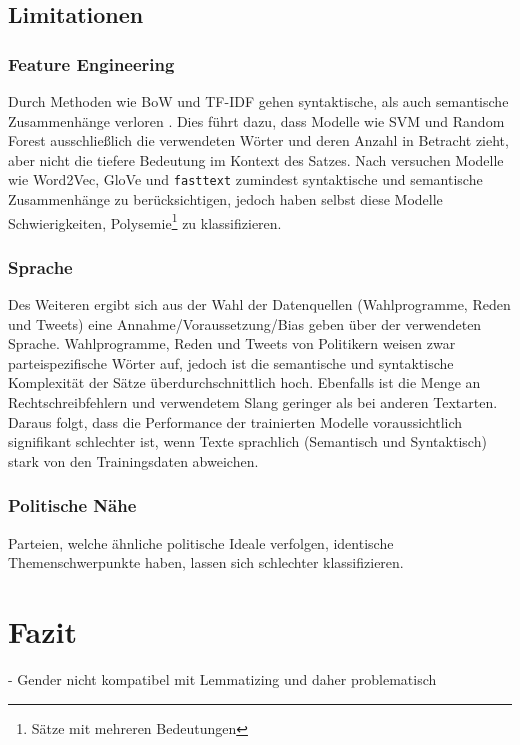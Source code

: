 \subsection{Limitationen}

\subsubsection{Feature Engineering}


Durch Methoden wie \ac{BoW} und \ac{TF-IDF} gehen syntaktische, als auch semantische Zusammenhänge verloren \autocite[48\psq]{kowsari_text_2019}. Dies führt dazu, dass Modelle wie \ac{SVM} und Random Forest ausschließlich die verwendeten Wörter und deren Anzahl in Betracht zieht, aber nicht die tiefere Bedeutung im Kontext des Satzes. Nach \textcite{kowsari_text_2019} versuchen Modelle wie Word2Vec, GloVe und \texttt{fasttext} zumindest syntaktische und semantische Zusammenhänge zu berücksichtigen, jedoch haben selbst diese Modelle Schwierigkeiten, Polysemie\footnote{Sätze mit mehreren Bedeutungen} zu klassifizieren.

\subsubsection{Sprache}


Des Weiteren ergibt sich aus der Wahl der Datenquellen (Wahlprogramme, Reden und Tweets) eine Annahme/Voraussetzung/Bias geben über der verwendeten Sprache. Wahlprogramme, Reden und Tweets von Politikern weisen zwar parteispezifische Wörter auf, jedoch ist die semantische und syntaktische Komplexität der Sätze überdurchschnittlich hoch. Ebenfalls ist die Menge an Rechtschreibfehlern und verwendetem Slang geringer als bei anderen Textarten. Daraus folgt, dass die Performance der trainierten Modelle voraussichtlich signifikant schlechter ist, wenn Texte sprachlich (Semantisch und Syntaktisch) stark von den Trainingsdaten abweichen.

\subsubsection{Politische Nähe}


Parteien, welche ähnliche politische Ideale verfolgen, identische Themenschwerpunkte haben, lassen sich schlechter klassifizieren.

\section{Fazit} \label{sec:crispConclusion}

- Gender nicht kompatibel mit Lemmatizing und daher problematisch 
